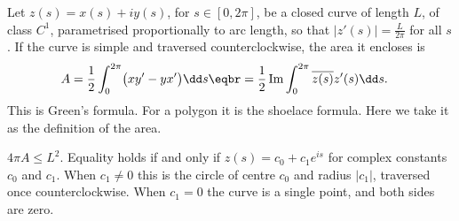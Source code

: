 Let $z(s)=x(s)+iy(s)$, for $s\in[0,2\pi]$, be a closed curve of length $L$, of class $C^1$, parametrised proportionally to arc length, so that $|z'(s)|=\frac L{2\pi}$ for all $s$. If the curve is simple and traversed counterclockwise, the area it encloses is
\[
\begin{aligned}A&=\frac12\int_0^{2\pi}\bigl(xy'-yx'\bigr)\dd s\eqbr=\frac12\operatorname{Im}\int_0^{2\pi}\overline{z(s)}z'(s)\dd s.\end{aligned}
\]
This is Green's formula. For a polygon it is the shoelace formula. Here we take it as the definition of the area.

\begin{theorem}\label{thm:isoperimetric}
$4\pi A\le L^2$. Equality holds if and only if $z(s)=c_0+c_1e^{is}$ for complex constants $c_0$ and $c_1$. When $c_1\ne0$ this is the circle of centre $c_0$ and radius $|c_1|$, traversed once counterclockwise. When $c_1=0$ the curve is a single point, and both sides are zero.
\end{theorem}
